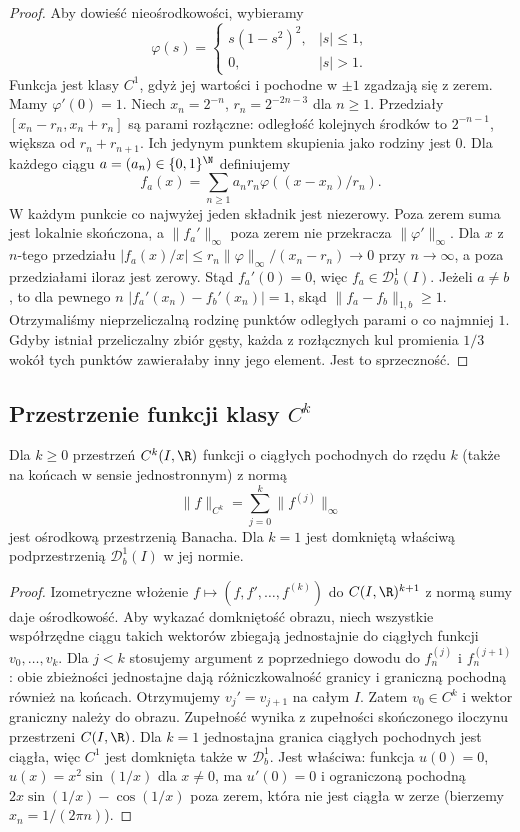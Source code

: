 \begin{proof}
Aby dowieść nieośrodkowości, wybieramy
\[
 \varphi(s)=
 \begin{cases}s(1-s^2)^2,&|s|\le1,\\0,&|s|>1.
 \end{cases}
\]
Funkcja jest klasy $C^1$, gdyż jej wartości
i pochodne w $\pm1$ zgadzają się z zerem.
Mamy $\varphi'(0)=1$. Niech $x_n=2^{-n}$,
$r_n=2^{-2n-3}$ dla $n\ge1$. Przedziały
$[x_n-r_n,x_n+r_n]$ są parami rozłączne:
odległość kolejnych środków to $2^{-n-1}$,
większa od $r_n+r_{n+1}$. Ich jedynym punktem
skupienia jako rodziny jest $0$.
Dla każdego ciągu $a=(a_n)\in\{0,1\}^{\N}$
definiujemy
\[
 f_a(x)=\sum_{n\ge1}a_nr_n
              \varphi((x-x_n)/r_n).
\]
W każdym punkcie co najwyżej jeden składnik
jest niezerowy. Poza zerem suma jest lokalnie
skończona, a $\|f_a'\|_\infty$ poza zerem
nie przekracza $\|\varphi'\|_\infty$.
Dla $x$ z $n$-tego przedziału
$|f_a(x)/x|\le r_n\|\varphi\|_\infty/(x_n-r_n)
\to0$ przy $n\to\infty$, a poza przedziałami
iloraz jest zerowy. Stąd $f_a'(0)=0$,
więc $f_a\in\mathcal D_b^1(I)$.
Jeżeli $a\ne b$, to dla pewnego $n$
$|f_a'(x_n)-f_b'(x_n)|=1$, skąd
$\|f_a-f_b\|_{1,b}\ge1$.
Otrzymaliśmy nieprzeliczalną rodzinę
punktów odległych parami o co najmniej $1$.
Gdyby istniał przeliczalny zbiór gęsty,
każda z rozłącznych kul promienia $1/3$
wokół tych punktów zawierałaby inny jego
element. Jest to sprzeczność.
\end{proof}

\subsection{Przestrzenie funkcji klasy \texorpdfstring{$C^k$}{Ck}}

\begin{twierdzenie}
\label{ma2:thm:ck-banach-separable}
Dla $k\ge0$ przestrzeń $C^k(I,\R)$ funkcji
o ciągłych pochodnych do rzędu $k$ (także
na końcach w sensie jednostronnym) z normą
\[
 \|f\|_{C^k}=\sum_{j=0}^k\|f^{(j)}\|_\infty
\]
jest ośrodkową przestrzenią Banacha.
Dla $k=1$ jest domkniętą właściwą podprzestrzenią
$\mathcal D_b^1(I)$ w jej normie.
\end{twierdzenie}
\begin{proof}
Izometryczne włożenie
$f\mapsto(f,f',\ldots,f^{(k)})$ do
$C(I,\R)^{k+1}$ z normą sumy daje
ośrodkowość. Aby wykazać domkniętość obrazu,
niech wszystkie współrzędne ciągu takich
wektorów zbiegają jednostajnie do ciągłych
funkcji $v_0,\ldots,v_k$.
Dla $j<k$ stosujemy argument z poprzedniego
dowodu do $f_n^{(j)}$ i $f_n^{(j+1)}$:
obie zbieżności jednostajne dają różniczkowalność
granicy i graniczną pochodną również na końcach.
Otrzymujemy $v_j'=v_{j+1}$ na całym $I$.
Zatem $v_0\in C^k$ i wektor graniczny
należy do obrazu. Zupełność wynika z
zupełności skończonego iloczynu przestrzeni
$C(I,\R)$. Dla $k=1$ jednostajna granica
ciągłych pochodnych jest ciągła, więc
$C^1$ jest domknięta także w $\mathcal D_b^1$.
Jest właściwa: funkcja $u(0)=0$,
$u(x)=x^2\sin(1/x)$ dla $x\ne0$,
ma $u'(0)=0$ i ograniczoną pochodną
$2x\sin(1/x)-\cos(1/x)$ poza zerem,
która nie jest ciągła w zerze
(bierzemy $x_n=1/(2\pi n)$).
\end{proof}

